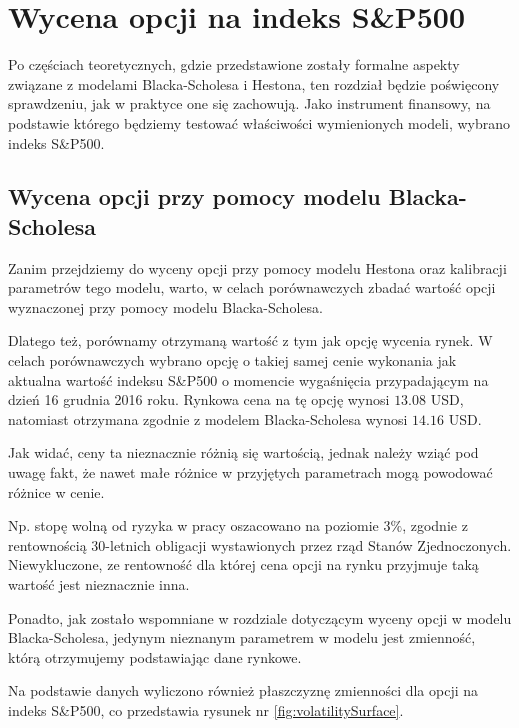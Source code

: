 \documentclass{pracamgr}
\begin{document}
{%
\chapter{Wycena opcji na indeks S\&P500}\label{r:sp}


Po częściach teoretycznych, gdzie przedstawione zostały formalne aspekty związane z modelami 
Blacka-Scholesa i Hestona, ten rozdział będzie poświęcony sprawdzeniu, jak w praktyce one się zachowują.
Jako instrument finansowy, na podstawie którego będziemy testować właściwości wymienionych modeli, 
wybrano indeks S\&P500. 

\section{Wycena opcji przy pomocy modelu Blacka-Scholesa}

Zanim przejdziemy do wyceny opcji  przy pomocy modelu Hestona oraz kalibracji
parametrów tego modelu, warto, w celach porównawczych zbadać wartość opcji 
wyznaczonej przy pomocy modelu Blacka-Scholesa. 


Dlatego też, porównamy otrzymaną wartość z tym jak opcję wycenia rynek.
W celach porównawczych wybrano opcję o takiej samej cenie wykonania jak aktualna wartość indeksu S\&P500 o momencie wygaśnięcia przypadającym na dzień 16 grudnia 2016 roku. 
Rynkowa cena na tę opcję wynosi $13.08$ USD, natomiast otrzymana zgodnie z modelem Blacka-Scholesa wynosi $14.16$ USD.

Jak widać, ceny ta nieznacznie różnią się wartością, jednak należy wziąć pod uwagę fakt, że nawet małe różnice w przyjętych parametrach mogą powodować różnice w cenie. 

Np. stopę wolną od ryzyka w pracy oszacowano na poziomie 3$\%$, zgodnie z rentownością 30-letnich obligacji wystawionych przez rząd Stanów Zjednoczonych. Niewykluczone, ze rentowność dla której cena opcji na rynku przyjmuje taką wartość jest nieznacznie inna.

Ponadto, jak zostało wspomniane w rozdziale dotyczącym wyceny opcji w modelu Blacka-Scholesa,
jedynym nieznanym parametrem w modelu jest zmienność, którą otrzymujemy podstawiając
dane rynkowe. 

Na podstawie danych wyliczono również płaszczyznę zmienności dla 
opcji na indeks S\&P500, co przedstawia rysunek nr \ref{fig:volatilitySurface}. 

}
\end{document}
